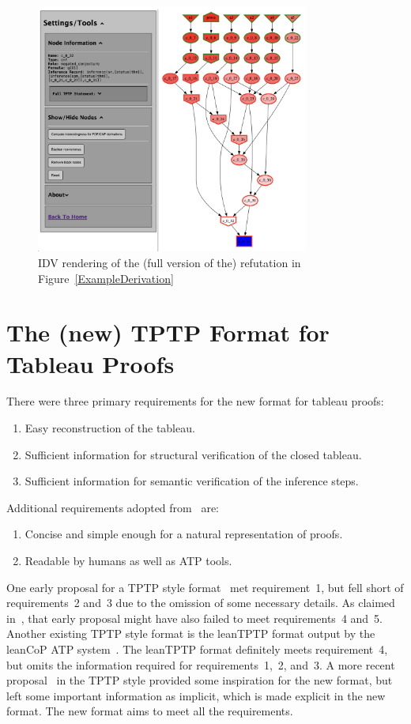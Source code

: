 \documentclass[runningheads]{llncs}
\begin{document}
\begin{figure}[htb]
\centering
\includegraphics[width=0.8\textwidth]{PaperFOFIDV.pdf}
\vspace*{-1em}
\caption{IDV rendering of the (full version of the) refutation in Figure~\ref{ExampleDerivation}}
\label{Refutation}
\end{figure}

\section{The (new) TPTP Format for Tableau Proofs}
\label{Tableau}

There were three primary requirements for the new format for tableau proofs:
\begin{enumerate}
\item Easy reconstruction of the tableau.
\item Sufficient information for structural verification of the closed tableau.
\item Sufficient information for semantic verification of the inference steps.
\end{enumerate}
Additional requirements adopted from~\cite{OH23} are:
\begin{enumerate}[resume]
\item Concise and simple enough for a natural representation of proofs.
\item Readable by humans as well as ATP tools.
\end{enumerate}
One early proposal for a TPTP style format~\cite{OS10} met requirement~1, but fell short
of requirements~2 and~3 due to the omission of some necessary details. 
As claimed in~\cite{OH23}, that early proposal might have also failed to meet requirements~4 and~5.
Another existing TPTP style format is the leanTPTP format output by the leanCoP ATP 
system~\cite{OB03}.
The leanTPTP format definitely meets requirement~4, but omits the information required for 
requirements~1,~2, and~3.
A more recent proposal~\cite{OH23} in the TPTP style provided some inspiration for the new format,
but left some important information as implicit, which is made explicit in the new format.
The new format aims to meet all the requirements.
\end{document}

